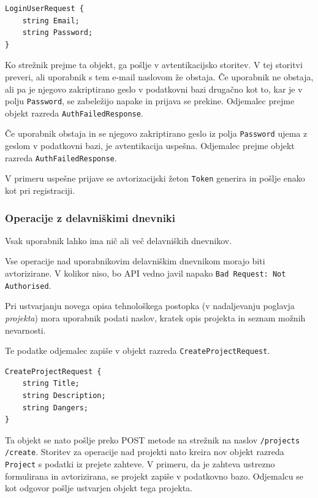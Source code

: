 \documentclass[a4paper, 12pt]{book}
\begin{document}
\begin{verbatim}
LoginUserRequest {
    string Email; 
    string Password; 
} 
\end{verbatim}

Ko strežnik prejme ta objekt, ga pošlje v avtentikacijsko storitev.
V tej storitvi preveri, ali uporabnik s tem e-mail naslovom že obstaja.
Če uporabnik ne obstaja, ali pa je njegovo zakriptirano geslo v podatkovni bazi drugačno kot to, kar je v polju \texttt{Password}, se zabeležijo napake in prijava se prekine.
Odjemalec prejme objekt razreda \texttt{AuthFailedResponse}.

Če uporabnik obstaja in se njegovo zakriptirano geslo iz polja \texttt{Password} ujema z geslom v podatkovni bazi, je avtentikacija uspešna.
Odjemalec prejme objekt razreda \texttt{AuthFailedResponse}.

V primeru uspešne prijave se avtorizacijski žeton \texttt{Token} generira in pošlje enako kot pri registraciji.

\subsubsection{Operacije z delavniškimi dnevniki}

Vsak uporabnik lahko ima nič ali več delavniških dnevnikov.

Vse operacije nad uporabnikovim delavniškim dnevnikom morajo biti avtorizirane.
V kolikor niso, bo API vedno javil napako \texttt{Bad Request: Not Authorised}.

Pri ustvarjanju novega opisa tehnološkega postopka (v nadaljevanju poglavja \textit{projekta}) mora uporabnik podati naslov, kratek opis projekta in seznam možnih nevarnosti.

Te podatke odjemalec zapiše v objekt razreda \texttt{CreateProjectRequest}.

\begin{verbatim}
CreateProjectRequest { 
    string Title;  
    string Description; 
    string Dangers; 
} 
\end{verbatim}

\noindent Ta objekt se nato pošlje preko POST metode na strežnik na naslov \texttt{/projects\\/create}.
Storitev za operacije nad projekti nato kreira nov objekt razreda \texttt{Project} s podatki iz prejete zahteve.
V primeru, da je zahteva ustrezno formulirana in avtorizirana, se projekt zapiše v podatkovno bazo.
Odjemalcu se kot odgovor pošlje ustvarjen objekt tega projekta.
\end{document}
